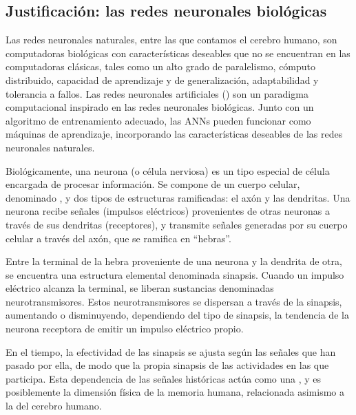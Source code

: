 %
%
\subsection{Justificación: las redes neuronales biológicas}
%
Las redes neuronales naturales, entre las que contamos el cerebro
humano, son computadoras biológicas con características deseables que
no se encuentran en las computadoras clásicas, tales como un alto
grado de paralelismo, cómputo distribuido, capacidad de aprendizaje y
de generalización, adaptabilidad y tolerancia a fallos.  Las redes
neuronales artificiales () son
un paradigma computacional inspirado en las redes neuronales
biológicas. Junto con un algoritmo de entrenamiento adecuado, las
ANNs pueden funcionar como máquinas de aprendizaje, incorporando
las características deseables de las redes neuronales naturales.

Biológicamente, una neurona (o célula nerviosa) es un tipo especial de
célula encargada de procesar información.  Se compone de un cuerpo
celular, denominado , y dos tipos de estructuras ramificadas:
el axón y las dendritas. Una neurona recibe señales (impulsos
eléctricos) provenientes de otras neuronas a través de sus dendritas
(receptores), y transmite señales generadas por su cuerpo celular a
través del axón, que se ramifica en ``hebras''.

Entre la terminal de la hebra proveniente de una neurona y la
dendrita de otra, se encuentra una estructura elemental denominada
sinapsis.  Cuando un impulso eléctrico alcanza la terminal,
se liberan sustancias denominadas neurotransmisores. Estos
neurotransmisores se dispersan a través de la sinapsis, aumentando o
disminuyendo, dependiendo del tipo de sinapsis, la tendencia de la
neurona receptora de emitir un impulso eléctrico propio.

En el tiempo, la efectividad de las sinapsis se ajusta según las
señales que han pasado por ella, de modo que la propia sinapsis
 de las actividades en las que participa. Esta dependencia
de las señales históricas actúa como una , y es
posiblemente la dimensión física de la memoria humana, relacionada
asimismo a la  del cerebro humano.
